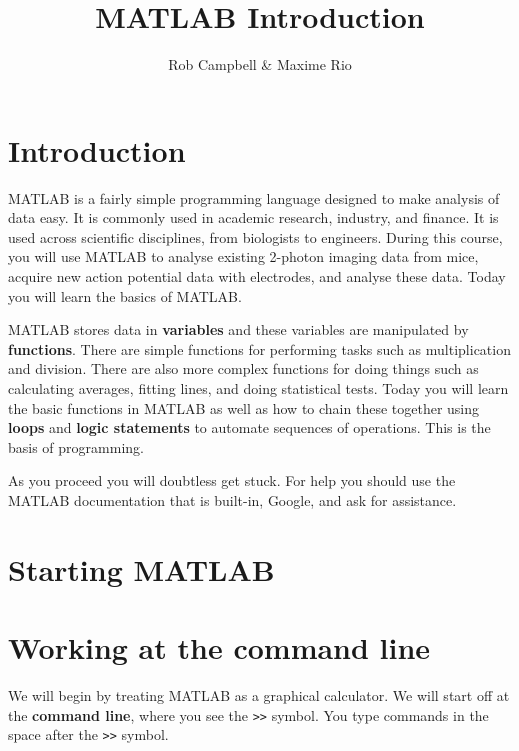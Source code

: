 \documentclass{article}
\title{MATLAB Introduction}
\author{Rob Campbell \& Maxime Rio}
\date{}
\begin{document}
\maketitle


\section*{Introduction}

MATLAB is a fairly simple programming language designed to make analysis of data easy.
It is commonly used in academic research, industry, and finance.
It is used across scientific disciplines, from biologists to engineers.
During this course, you will use MATLAB to analyse existing 2-photon imaging data from mice, acquire new action potential data with electrodes, and analyse these data.
Today you will learn the basics of MATLAB.

MATLAB stores data in \textbf{variables} and these variables are manipulated by \textbf{functions}.
There are simple functions for performing tasks such as multiplication and division.
There are also more complex functions for doing things such as calculating averages, fitting lines, and doing statistical tests.
Today you will learn the basic functions in MATLAB as well as how to chain these together using \textbf{loops} and \textbf{logic statements} to automate sequences of operations.
This is the basis of programming.

As you proceed you will doubtless get stuck.
For help you should use the MATLAB documentation that is built-in, Google, and ask for assistance.


\section{Starting MATLAB}



\section{Working at the command line}

We will begin by treating MATLAB as a graphical calculator.
We will start off at the \textbf{command line}, where you see the \verb|>>| symbol.
You type commands in the space after the \verb|>>| symbol.
\end{document}
